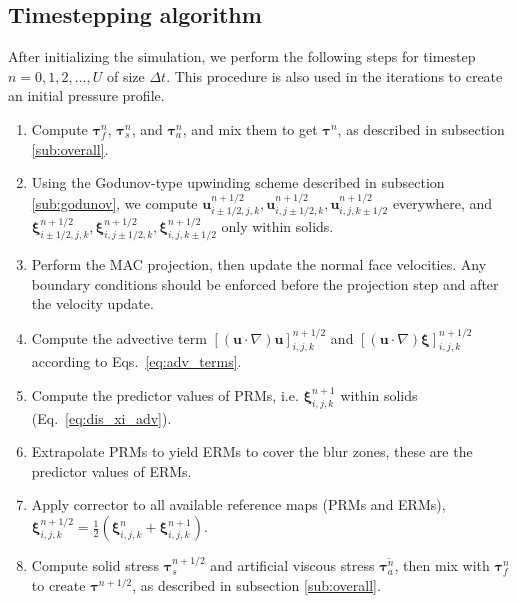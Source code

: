 \documentclass[times, 10pt]{article}
\renewcommand{\vec}[1]{\mathbf{#1}}
\newcommand{\vu}{\vec{u}}
\newcommand{\vxi}{\boldsymbol\xi}
\newcommand{\vtau}{\boldsymbol\tau}
\begin{document}
%
\subsection{Timestepping algorithm}
\label{sub:timestepping}

After initializing the simulation, we perform the following steps for timestep $n=0, 1, 2, \ldots, U$ of size $\Delta t$.
This procedure is also used in the iterations to create an initial pressure profile.
\begin{enumerate}
	\item Compute $\vtau_f^n$, $\vtau_s^n$, and $\vtau_a^n$, and mix them to get $\vtau^n$, as described in subsection \ref{sub:overall}.

    \item Using the Godunov-type upwinding scheme described in subsection \ref{sub:godunov}, we compute $\vu_{i\pm1/2,j,k}^{n+1/2}, \vu_{i,j\pm1/2,k}^{n+1/2}, \vu_{i,j,k\pm1/2}^{n+1/2}$ everywhere, and $\vxi_{i\pm1/2,j,k}^{n+1/2}, \vxi_{i,j\pm1/2,k}^{n+1/2}, \vxi_{i,j,k\pm1/2}^{n+1/2}$ only within solids.

	\item Perform the MAC projection, then update the normal face velocities.
	Any boundary conditions should be enforced before the projection step and after the velocity update.

	\item Compute the advective term $ [(\vu \cdot \nabla) \vu ]_{i,j,k}^{n+1/2}$ and $ [(\vu \cdot \nabla) \vxi ]_{i,j,k}^{n+1/2}$ according to Eqs.~\eqref{eq:adv_terms}.

	\item Compute the predictor values of PRMs, i.e. $\vxi_{i,j,k}^{n+1}$ within solids (Eq.~\eqref{eq:dis_xi_adv}).

	\item Extrapolate PRMs to yield ERMs to cover the blur zones, these are the predictor values of ERMs.

	\item Apply corrector to all available reference maps (PRMs and ERMs), $\vxi_{i,j,k}^{n+1/2} = \frac12 \left(\vxi_{i,j,k}^{n} + \vxi_{i,j,k}^{n+1}\right) $.

	\item Compute solid stress  $\vtau_s^{n+1/2}$ and artificial viscous stress $\vtau_a^{\tilde{n}}$, then mix with $\vtau_f^n$ to create $\vtau^{n+1/2}$, as described in subsection \ref{sub:overall}.


\end{enumerate}
\end{document}
